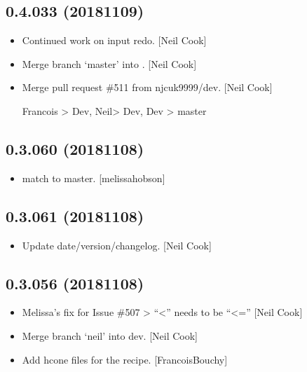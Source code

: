 \documentclass[a4paper,10pt,english]{report}
\begin{document}
\subsection{0.4.033 (2018\sphinxhyphen{}11\sphinxhyphen{}09)}
\label{\detokenize{misc/changelog:id282}}\begin{itemize}
\item {} 
Continued work on input redo. {[}Neil Cook{]}

\item {} 
Merge branch ‘master’ into . {[}Neil Cook{]}

\item {} 
Merge pull request \#511 from njcuk9999/dev. {[}Neil Cook{]}

Francois \textendash{}\textgreater{} Dev, Neil\textendash{}\textgreater{} Dev, Dev \textendash{}\textgreater{} master

\end{itemize}


\subsection{0.3.060 (2018\sphinxhyphen{}11\sphinxhyphen{}08)}
\label{\detokenize{misc/changelog:id283}}\begin{itemize}
\item {} 
 match to master. {[}melissa\sphinxhyphen{}hobson{]}

\end{itemize}


\subsection{0.3.061 (2018\sphinxhyphen{}11\sphinxhyphen{}08)}
\label{\detokenize{misc/changelog:id284}}\begin{itemize}
\item {} 
Update date/version/changelog. {[}Neil Cook{]}

\end{itemize}


\subsection{0.3.056 (2018\sphinxhyphen{}11\sphinxhyphen{}08)}
\label{\detokenize{misc/changelog:id285}}\begin{itemize}
\item {} 
 \sphinxhyphen{} Melissa’s fix for Issue \#507 \sphinxhyphen{}\textgreater{}   “\textless{}” needs to be “\textless{}=”
{[}Neil Cook{]}

\item {} 
Merge branch ‘neil’ into dev. {[}Neil Cook{]}

\item {} 
Add hcone files for the  recipe. {[}FrancoisBouchy{]}

\end{itemize}
\end{document}
